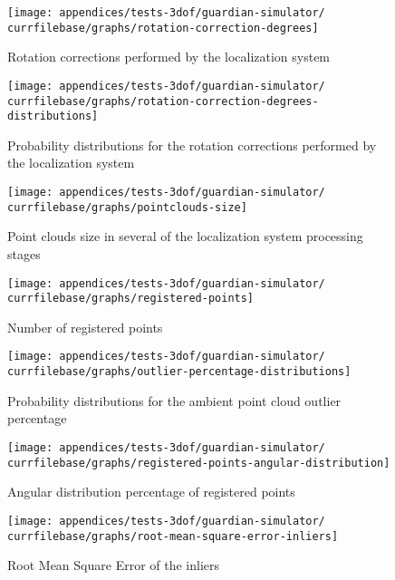 \begin{figure}[H]
	\centering
	\texttt{[image: appendices/tests-3dof/guardian-simulator/\\currfilebase/graphs/rotation-correction-degrees]}
	\caption{Rotation corrections performed by the localization system}
\end{figure}

\begin{figure}[H]
	\centering
	\texttt{[image: appendices/tests-3dof/guardian-simulator/\\currfilebase/graphs/rotation-correction-degrees-distributions]}
	\caption{Probability distributions for the rotation corrections performed by the localization system}
\end{figure}


\begin{figure}[H]
	\centering
	\texttt{[image: appendices/tests-3dof/guardian-simulator/\\currfilebase/graphs/pointclouds-size]}
	\caption{Point clouds size in several of the localization system processing stages}
\end{figure}

\begin{figure}[H]
	\centering
	\texttt{[image: appendices/tests-3dof/guardian-simulator/\\currfilebase/graphs/registered-points]}
	\caption{Number of registered points}
\end{figure}

\begin{figure}[H]
	\centering
	\texttt{[image: appendices/tests-3dof/guardian-simulator/\\currfilebase/graphs/outlier-percentage-distributions]}
	\caption{Probability distributions for the ambient point cloud outlier percentage}
\end{figure}


\begin{figure}[H]
	\centering
	\texttt{[image: appendices/tests-3dof/guardian-simulator/\\currfilebase/graphs/registered-points-angular-distribution]}
	\caption{Angular distribution percentage of registered points}
\end{figure}

\begin{figure}[H]
	\centering
	\texttt{[image: appendices/tests-3dof/guardian-simulator/\\currfilebase/graphs/root-mean-square-error-inliers]}
	\caption{Root Mean Square Error of the inliers}
\end{figure}

